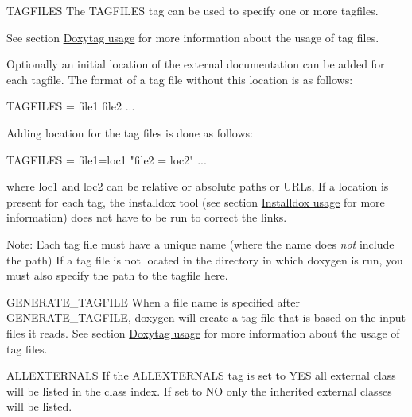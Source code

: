 \begin{DoxyDescription}
\item[{\ttfamily TAGFILES} ] The {\ttfamily TAGFILES} tag can be used to specify one or more tagfiles.

See section \hyperlink{doxytag_usage}{Doxytag usage} for more information about the usage of tag files.

Optionally an initial location of the external documentation can be added for each tagfile. The format of a tag file without this location is as follows: 
\begin{DoxyPre}
TAGFILES = file1 file2 ... \end{DoxyPre}
 Adding location for the tag files is done as follows: 
\begin{DoxyPre}
TAGFILES = file1=loc1 "file2 = loc2" ... \end{DoxyPre}
 where {\ttfamily loc1} and {\ttfamily loc2} can be relative or absolute paths or URLs, If a location is present for each tag, the installdox tool (see section \hyperlink{installdox_usage}{Installdox usage} for more information) does not have to be run to correct the links.

\begin{DoxyParagraph}{Note:}
Each tag file must have a unique name (where the name does {\itshape not\/} include the path) If a tag file is not located in the directory in which doxygen is run, you must also specify the path to the tagfile here.
\end{DoxyParagraph}
\label{config_cfg_generate_tagfile}
\hypertarget{config_cfg_generate_tagfile}{}
 
\item[{\ttfamily GENERATE\_\-TAGFILE} ] When a file name is specified after {\ttfamily GENERATE\_\-TAGFILE}, doxygen will create a tag file that is based on the input files it reads. See section \hyperlink{doxytag_usage}{Doxytag usage} for more information about the usage of tag files.

\label{config_cfg_allexternals}
\hypertarget{config_cfg_allexternals}{}
 
\item[{\ttfamily ALLEXTERNALS} ] If the {\ttfamily ALLEXTERNALS} tag is set to {\ttfamily YES} all external class will be listed in the class index. If set to {\ttfamily NO} only the inherited external classes will be listed.

\label{config_cfg_external_groups}
\hypertarget{config_cfg_external_groups}{}
 

\end{DoxyDescription}

